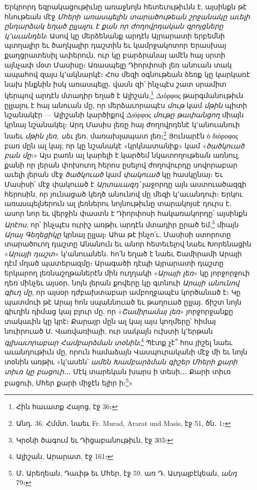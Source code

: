 \documentclass{article}
\begin{document}
{Երկրորդ եզրակացութիւնը առաջնոյն հետեւութիւնն է, այսինքն թէ հնութեան մէջ \emph{Մհերի առասպելին տարածութեան շրջանակը աւելի ընդարձակ եղած ըլլալու է քան որ ժողովրդական զրոյցները կ՚աւանդեն}։ Ասով կը մերձենանք արդէն Այրարատի երբեմնի պտղալիր եւ ծաղկալիր դաշտին եւ կամրջակոտոր Երասխայ քաղցրատեսիլ ափերուն, ուր կը բարձրանայ ամէն հայ սրտի այնչափ մօտ Մասիսը։ Առասպելը Դիորփոսի լեռ անուան տակ ապահով զայս կ՚ակնարկէ։ Հոս մեզի օգնութեան ձեռք կը կարկառէ նախ ինքնին իսկ առասպելը․ վասն զի՝ ինչպէս շատ սրամիտ կերպով արդէն մտադիր եղած է Ալիշան,\footnote{Հին հաւատք Հայոց, էջ 36։} Διόρφος թարգմանութիւն ըլլալու է հայ անուան մը, որ մերձաւորապէս \emph{մութ} կամ \emph{մթին} պիտի նշանակէր — Ալիշանի կարծիքով Διόρφος \emph{մութը թափանցող} միայն կրնայ նշանակել։ Արդ Մասիս լեռը հայ ժողովրդենէ կ՚անուանուի նաեւ \emph{մթին լեռ, սեւ} լեռ, մառախլապատ լեռ։\footnote{Անդ․ 36. Հմմտ․ նաեւ Fr. Murad, Ararat und Masis, էջ 51, ծն․ 1։} Յունարէն ὁ διόροφος բառ մըն ալ կայ, որ կը նշանակէ «կրկնատանիք» կամ «\emph{ծածկուած բան մը}։» Այս բառն ալ կարելի է կարծեմ նկատողութեան առնուլ, քանի որ լերան փոխուող հերոս ըսելով ժողովուրդը սովորաբար աւելի լերան մէջ \emph{ծածկուած} կամ \emph{փակուած} կը հասկընայ։ Եւ Մասիսի՛ մէջ փակուած է \emph{Արտաւազդ՝} յաջորդը այն աստուածազգի հերոսին, որ յունացած կեղծ անունով մը մեզի կ՚աւանդուի։ Երկու առասպելներուն ալ լեռներու նոյնութիւնը տարակոյսէ դուրս է․ ասոր նոր եւ վերջին փաստն է Դիորփոսի հակառակորդը՝ այսինքն \emph{Արէոս}, որ՝ ինչպէս ուրիշ առթիւ արդէն մտադիր ըրած եմ,\footnote{Կրօնի ծագում եւ Դիցաբանութիւն, էջ 303։} միայն \emph{Արայ Գեղեցիկը} կրնայ ըլլալ։ Ահա թէ ինչո՛ւ․ Մասիսի ստորոտը տարածուող դաշտը Անանուն եւ անոր հետեւելով նաեւ Խորենացին «\emph{Արայի դաշտ}» կ՚անուանեն․ հո՛ն եղած է նաեւ Շամիրամի Արայի դէմ մղած պատերազմը։ Արագածի դէպի Այրարատի դաշտը երկարող լեռնաշղթաներէն մին ուղղակի «\emph{Արայի լեռ}» կը յորջորջուի դեռ մինչեւ այսօր․ նոյն լերան քովերը կը գտնուի \emph{Արայի անունով գիւղ մը}, որ այսօր դժբախտաբար ամբողջապէս կործանած է։ Կը պատմուի թէ Արայ հոն սպաննուած եւ թաղուած ըլլայ․ ճիշտ նոյն գիւղին դիմաց կայ բլուր մը, որ «\emph{Շամիրամայ լեռ}» յորջորջանքը տակաւին կը կրէ։ Քարայր մըն ալ կայ այս կողմերը՝ հիմայ նուիրուած Ս․ Վառվառիայի, ուր սակայն ուխտի կ՚երթան \emph{գլխաւորաբար Համբարձման տօնին}։\footnote{Ալիշան, Արարատ, էջ 161։} Պէտք չէ՞ հոս յիշել նաեւ աւանդութիւն մը, որուն համաձայն Վասպուրականի մէջ մի եւ նոյն տօնին առթիւ «կ՚ասեն՝ \emph{ամեն Խամբարձման գիշեր Մհերի քարի տիւռ կը բացուի}․․․ Մէկ տարեկան խարս ի տեսի․․․ Քարի տիւռ բացուի, Մհեր քարի միջէն ելիր ի։\footnote{Մ․ Արեղեան, Դաւիթ եւ Մհեր, էջ 59. առ Դ․ Աւդալբէկեան, \emph{անդ} 79։}»

}
\end{document}
